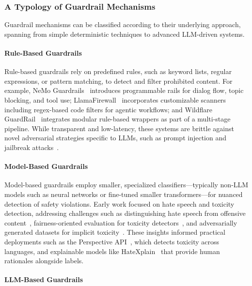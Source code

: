 \subsubsection{A Typology of Guardrail Mechanisms}

Guardrail mechanisms can be classified according to their underlying approach, spanning from simple deterministic techniques to advanced LLM-driven systems.

\paragraph{Rule-Based Guardrails}

Rule-based guardrails rely on predefined rules, such as keyword lists, regular expressions, or pattern matching, to detect and filter prohibited content. For example, NeMo Guardrails~\citep{Rebedea2023NeMoGA} introduces programmable rails for dialog flow, topic blocking, and tool use; LlamaFirewall~\citep{Chennabasappa2025LlamaFirewallAO} incorporates customizable scanners including regex-based code filters for agentic workflows; and Wildflare GuardRail~\citep{Han2025BridgingTS} integrates modular rule-based wrappers as part of a multi-stage pipeline. While transparent and low-latency, these systems are brittle against novel adversarial strategies specific to LLMs, such as prompt injection and jailbreak attacks~\citep{Wang2025SoKEJ}.

\paragraph{Model-Based Guardrails}

Model-based guardrails employ smaller, specialized classifiers---typically non-LLM models such as neural networks or fine-tuned smaller transformers---for nuanced detection of safety violations. Early work focused on hate speech and toxicity detection, addressing challenges such as distinguishing hate speech from offensive content~\citep{Davidson2017AutomatedHS}, fairness-oriented evaluation for toxicity detectors~\citep{Borkan2019NuancedMF}, and adversarially generated datasets for implicit toxicity~\citep{Hartvigsen2022ToxiGenAL}. These insights informed practical deployments such as the Perspective API~\citep{Lees2022ANG}, which detects toxicity across languages, and explainable models like HateXplain~\citep{Mathew2020HateXplainAB} that provide human rationales alongside labels.

\paragraph{LLM-Based Guardrails}

